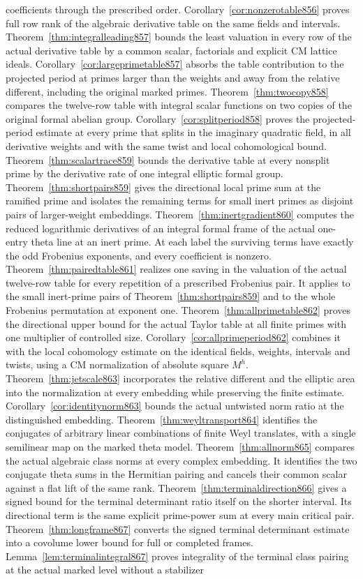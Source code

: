 \documentclass[a4paper,11pt]{article}
\theoremstyle{definition}
\theoremstyle{remark}
\numberwithin{equation}{section}
\begin{document}
coefficients through the prescribed order. Corollary~\ref{cor:nonzerotable856} proves full row rank of the algebraic derivative table on the same fields and intervals. Theorem~\ref{thm:integralleading857} bounds the least valuation in every row of the actual derivative table by a common scalar, factorials and explicit CM lattice ideals. Corollary~\ref{cor:largeprimetable857} absorbs the table contribution to the projected period at primes larger than the weights and away from the relative different, including the original marked primes. Theorem~\ref{thm:twocopy858} compares the twelve-row table with integral scalar functions on two copies of the original formal abelian group. Corollary~\ref{cor:splitperiod858} proves the projected-period estimate at every prime that splits in the imaginary quadratic field, in all derivative weights and with the same twist and local cohomological bound. Theorem~\ref{thm:scalartrace859} bounds the derivative table at every nonsplit prime by the derivative rate of one integral elliptic formal group. Theorem~\ref{thm:shortpairs859} gives the directional local prime sum at the ramified prime and isolates the remaining terms for small inert primes as disjoint pairs of larger-weight embeddings. Theorem~\ref{thm:inertgradient860} computes the reduced logarithmic derivatives of an integral formal frame of the actual one-entry theta line at an inert prime. At each label the surviving terms have exactly the odd Frobenius exponents, and every coefficient is nonzero. Theorem~\ref{thm:pairedtable861} realizes one saving in the valuation of the actual twelve-row table for every repetition of a prescribed Frobenius pair. It applies to the small inert-prime pairs of Theorem~\ref{thm:shortpairs859} and to the whole Frobenius permutation at exponent one. Theorem~\ref{thm:allprimetable862} proves the directional upper bound for the actual Taylor table at all finite primes with one multiplier of controlled size. Corollary~\ref{cor:allprimeperiod862} combines it with the local cohomology estimate on the identical fields, weights, intervals and twists, using a CM normalization of absolute square \(M^h\). Theorem~\ref{thm:jetscale863} incorporates the relative different and the elliptic area into the normalization at every embedding while preserving the finite estimate. Corollary~\ref{cor:identitynorm863} bounds the actual untwisted norm ratio at the distinguished embedding. Theorem~\ref{thm:weyltransport864} identifies the conjugates of arbitrary linear combinations of finite Weyl translates, with a single semilinear map on the marked theta model. Theorem~\ref{thm:allnorm865} compares the actual algebraic class norms at every complex embedding. It identifies the two conjugate theta sums in the Hermitian pairing and cancels their common scalar against a flat lift of the same rank. Theorem~\ref{thm:terminaldirection866} gives a signed bound for the terminal determinant ratio itself on the shorter interval. Its directional term is the same explicit prime-power sum at every main critical pair. Theorem~\ref{thm:longframe867} converts the signed terminal determinant estimate into a covolume lower bound for full or completed frames. Lemma~\ref{lem:terminalintegral867} proves integrality of the terminal class pairing at the actual marked level without a stabilizer 
\end{document}
